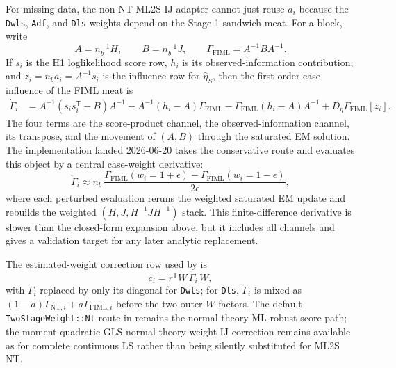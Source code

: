 \documentclass[11pt]{article}
\newcommand{\T}{^{\mathsf T}}
\theoremstyle{plain}
\theoremstyle{remark}
\begin{document}
For missing data, the non-NT ML2S IJ adapter cannot just reuse $a_i$ because the
\texttt{Dwls}, \texttt{Adf}, and \texttt{Dls} weights depend on the Stage-1
sandwich meat.  For a block, write
\[
  A = n_b^{-1}H,\qquad
  B = n_b^{-1}J,\qquad
  \Gamma_{\mathrm{FIML}} = A^{-1}BA^{-1}.
\]
If $s_i$ is the H1 loglikelihood score row, $h_i$ is its observed-information
contribution, and $z_i = n_b a_i = A^{-1}s_i$ is the influence row for
$\hat\eta_S$, then the first-order case influence of the FIML meat is
\begin{align}
  \dot\Gamma_i
    &= A^{-1}(s_is_i\T - B)A^{-1}
       - A^{-1}(h_i-A)\Gamma_{\mathrm{FIML}}
       - \Gamma_{\mathrm{FIML}}(h_i-A)A^{-1}
       + D_\eta\Gamma_{\mathrm{FIML}}[z_i].
\end{align}
The four terms are the score-product channel, the observed-information channel,
its transpose, and the movement of $(A,B)$ through the saturated EM solution.
The implementation landed 2026-06-20 takes the conservative route and evaluates
this object by a central case-weight derivative:
\[
  \dot\Gamma_i
    \approx n_b\,
      \frac{\Gamma_{\mathrm{FIML}}(w_i=1+\epsilon)
            -\Gamma_{\mathrm{FIML}}(w_i=1-\epsilon)}
           {2\epsilon},
\]
where each perturbed evaluation reruns the weighted saturated EM update and
rebuilds the weighted $(H,J,H^{-1}JH^{-1})$ stack.  This finite-difference
derivative is slower than the closed-form expansion above, but it includes all
channels and gives a validation target for any later analytic replacement.

The estimated-weight correction row used by
 is
\[
  c_i = r\T W\,\dot\Gamma_i\,W,
\]
with $\dot\Gamma_i$ replaced by only its diagonal for \texttt{Dwls}; for
\texttt{Dls}, $\dot\Gamma_i$ is mixed as
$(1-a)\dot\Gamma_{\mathrm{NT},i}+a\dot\Gamma_{\mathrm{FIML},i}$ before the two
outer $W$ factors.  The default \texttt{TwoStageWeight::Nt} route in
 remains the normal-theory ML robust-score
path; the moment-quadratic GLS normal-theory-weight IJ correction remains
available as  for complete continuous LS
rather than being silently substituted for ML2S NT.
\end{document}
